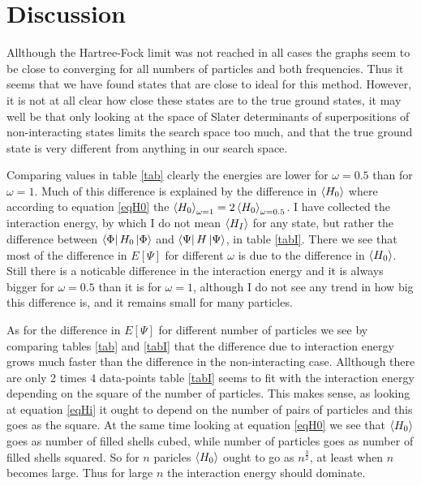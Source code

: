 \documentclass[a4paper,english,12pt]{article}
\newcommand{\f}{\frac}
\begin{document}

\section{Discussion}
Allthough the Hartree-Fock limit was not reached in all cases the graphs seem to be close to converging for all numbers of particles
and both frequencies. Thus it seems that we have found states that are close to ideal for this method. However, it is not at all clear how close these
states are to the true ground states, it may well be that only looking at the space of Slater determinants of superpositions of non-interacting states
limits the search space too much, and that the true ground state is very different from anything in our search space.

Comparing values in table \ref{tab} clearly the energies are lower for $\omega = 0.5$ than for $\omega = 1$. Much of this difference is explained by
the difference in $\Braket{H_0}$ where according to equation \ref{eqH0} the \(\Braket{H_0}_{\omega = 1} = 2\Braket{H_0}_{\omega = 0.5}\).
I have collected the interaction energy, by which I do not mean $\Braket{H_I}$ for any state, but rather the difference between
$\Bra{\Phi}H_0\Ket{\Phi}$ and $\Bra{\Psi}H\Ket{\Psi}$, in table \ref{tabI}. There we see that most of the difference in $E[\Psi]$ for different $\omega$
is due to the difference
in $\Braket{H_0}$. 
Still there is a noticable difference in the interaction energy and it is always bigger for $\omega = 0.5$ than it is for
$\omega = 1$, although I do not see any trend in how big this difference is, and it remains small for many particles.

As for the difference in $E[\Psi]$ for different number of particles we see by comparing tables \ref{tab} and \ref{tabI}
that the difference due to interaction energy grows much faster than the difference in the non-interacting case.
Allthough there are only 2 times 4 data-points table \ref{tabI} seems to fit with the interaction energy depending on
the square of the number of particles. This makes sense, as looking at equation \ref{eqHi} it ought to depend on the number of pairs of particles
and this goes as the square. At the same time looking at equation \ref{eqH0} we see that $\braket{H_0}$ goes as number of filled shells cubed,
while number of particles goes as number of filled shells squared. So for $n$ paricles $\braket{H_0}$ ought to go as $n^{\f{3}{2}}$, at least when $n$
becomes large. Thus for large $n$ the interaction energy should dominate.
\end{document}
